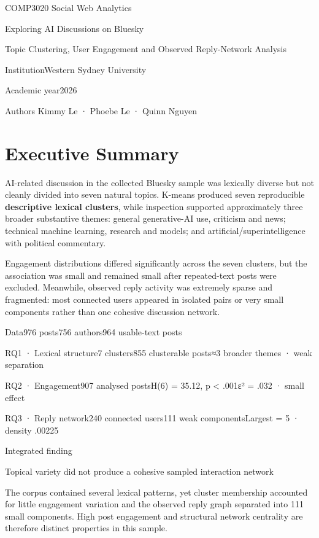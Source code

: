 \documentclass[
]{article}
\author{}
\date{\vspace{-2.5em}}
\begin{document}
{
\setcounter{tocdepth}{3}
\tableofcontents
}
COMP3020 Social Web Analytics

Exploring AI Discussions on Bluesky

Topic Clustering, User Engagement and Observed Reply-Network Analysis

{Institution}{Western Sydney University}

{Academic year}{2026}

{Authors} {Kimmy Le · Phoebe Le · Quinn Nguyen}

\section{Executive Summary}\label{executive-summary}

AI-related discussion in the collected Bluesky sample was lexically
diverse but not cleanly divided into seven natural topics. K-means
produced seven reproducible \textbf{descriptive lexical clusters}, while
inspection supported approximately three broader substantive themes:
general generative-AI use, criticism and news; technical machine
learning, research and models; and artificial/superintelligence with
political commentary.

Engagement distributions differed significantly across the seven
clusters, but the association was small and remained small after
repeated-text posts were excluded. Meanwhile, observed reply activity
was extremely sparse and fragmented: most connected users appeared in
isolated pairs or very small components rather than one cohesive
discussion network.

{Data}976 posts{756 authors}964 usable-text posts

{RQ1 · Lexical structure}7 clusters{855 clusterable posts}≈3 broader
themes · weak separation

{RQ2 · Engagement}907 analysed posts{H(6) = 35.12, p \textless{} .001}ε²
= .032 · small effect

{RQ3 · Reply network}240 connected users{111 weak components}Largest = 5
· density .00225

Integrated finding

Topical variety did not produce a cohesive sampled interaction network

The corpus contained several lexical patterns, yet cluster membership
accounted for little engagement variation and the observed reply graph
separated into 111 small components. High post engagement and structural
network centrality are therefore distinct properties in this sample.
\end{document}
